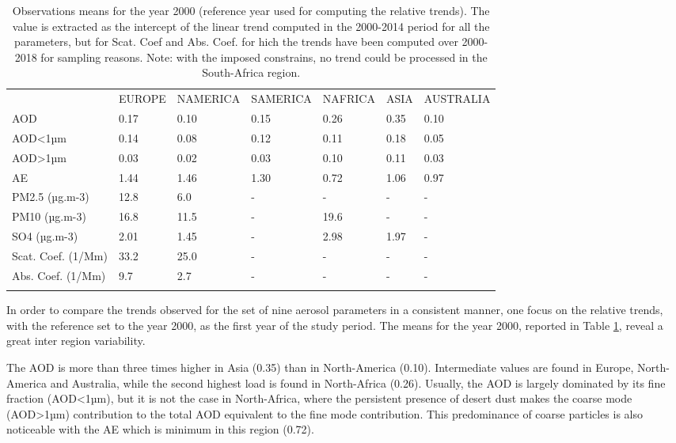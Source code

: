 \documentclass[journal abbreviation, manuscript]{copernicus}
\begin{document}
\begin{table}
\begin{tabular}{lllllll}
\tophline
                    & EUROPE & NAMERICA & SAMERICA & NAFRICA &  ASIA & AUSTRALIA \\
\middlehline
                AOD &   0.17 &     0.10 &     0.15 &    0.26 &  0.35 &      0.10 \\
            AOD<1µm &   0.14 &     0.08 &     0.12 &    0.11 &  0.18 &      0.05 \\
            AOD>1µm &   0.03 &     0.02 &     0.03 &    0.10 &  0.11 &      0.03 \\
                 AE &   1.44 &     1.46 &     1.30 &    0.72 &  1.06 &      0.97 \\
     PM2.5 (µg.m-3) &   12.8 &      6.0 &        - &       - &     - &         - \\
      PM10 (µg.m-3) &   16.8 &     11.5 &        - &    19.6 &     - &         - \\
       SO4 (µg.m-3) &   2.01 &     1.45 &        - &    2.98 &  1.97 &         - \\
 Scat. Coef. (1/Mm) &   33.2 &     25.0 &        - &       - &     - &         - \\
  Abs. Coef. (1/Mm) &    9.7 &      2.7 &        - &       - &     - &         - \\
\bottomhline
\end{tabular}

 \caption{Observations means for the year 2000 (reference year used for computing the relative trends). The value is extracted as the intercept of the linear trend computed in the 2000-2014 period for all the parameters, but for Scat. Coef and Abs. Coef. for hich the trends have been computed over 2000-2018 for sampling reasons. Note: with the imposed constrains, no trend could be processed in the South-Africa region.}
 \label{table:obs_2000mean}
\end{table}

In order to compare the trends observed for the set of nine aerosol parameters in a consistent manner, one focus on the relative trends, with the reference set to the year 2000, as the first year of the study period. The means for the year 2000, reported in Table \ref{table:obs_2000mean}, reveal a great inter region variability.

The AOD is more than three times higher in Asia (0.35) than in North-America (0.10). Intermediate values are found in Europe, North-America and Australia, while the second highest load is found in North-Africa (0.26). Usually, the AOD is largely dominated by its fine fraction (AOD<1µm), but it is not the case in North-Africa, where the persistent presence of desert dust makes the coarse mode (AOD>1µm) contribution to the total AOD equivalent to the fine mode contribution. This predominance of coarse particles is also noticeable with the AE which is minimum in this region (0.72).
\end{document}
